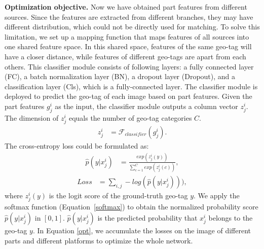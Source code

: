 \documentclass[journal]{IEEEtran}
\begin{document}
\textbf{Optimization objective.}
Now we have obtained part features from different sources. Since the features are extracted from different branches, they may have different distribution, which could not be directly used for matching. 
To solve this limitation, we set up a mapping function that maps features of all sources into one shared feature space. 
In this shared space, features of the same geo-tag will have a closer distance, while features of different geo-tags are apart from each others.
This classifier module consists of following layers: a fully connected layer (FC), a batch normalization layer (BN), a dropout layer (Dropout), and a classification layer (Cls), which is a fully-connected layer. 
The classifier module is deployed to predict the geo-tag of each image based on part features. 
Given the part features $g_j^i$ as the input, the classifier module outputs a column vector $z_j^i$. The dimension of $z_j^i$ equals the number of geo-tag categories $C$.
\begin{align}\label{z}
    z_{j}^i &= \mathcal{F}_{classifier}(g_j^i).
\end{align}
The cross-entropy loss could be formulated as:
\begin{align}\label{softmax}
    \hat{p}(y|x_j^i) &= \frac{exp(z_j^i(y))}{\sum_{c=1}^{C}exp(z_j^i(c))},
\end{align}
\begin{align}\label{opt}
    Loss &= \sum_{i,j}-log(\hat{p}(y|x_j^i))),
\end{align}
where $z_j^i(y)$ is  the logit score  of the ground-truth geo-tag  $y$. We apply the softmax function (Equation~\ref{softmax}) to obtain the normalized probability score $\hat{p}(y|x_j^i)$ in $[0,1]$. $\hat{p}(y|x_j^i)$ is the predicted probability that $x_j^i$ belongs to the geo-tag  $y$. 
In Equation \ref{opt}, we accumulate the losses on the image of different parts and different platforms to optimize the whole network. 
\end{document}
